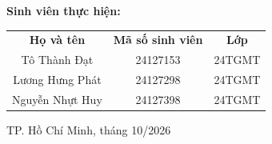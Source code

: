 \begin{titlepage}
\vspace*{0.6cm}
\hspace*{2cm} {\normalsize \textbf{Sinh viên thực hiện:}}
\begin{center}
  \setlength{\tabcolsep}{1.8em}
  {\normalfont
    \renewcommand{\arraystretch}{0.9}
    \small
    \begin{tabular}{@{}c c c@{}}
      \textbf{Họ và tên} & \textbf{Mã số sinh viên} & \textbf{Lớp} \\
            Tô Thành Đạt    & 24127153 & 24TGMT \\
            Lương Hưng Phát & 24127298 & 24TGMT \\
            Nguyễn Nhựt Huy & 24127398 & 24TGMT
    \end{tabular}
  }
\end{center}

\vspace*{2.5cm}
  \begin{center}
    TP. Hồ Chí Minh, tháng 10/2026
  \end{center}
\end{titlepage}
